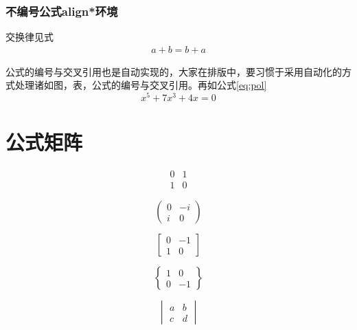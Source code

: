 \documentclass[12pt]{ctexbook}  %
\begin{document}
	\subsection{不编号公式align*环境}
	交换律见式
	\begin{align*}
		a+b=b+a	%
	\end{align*}

	公式的编号与交叉引用也是自动实现的，大家在排版中，要习惯于采用自动化的方式处理诸如图，表，公式的编号与交叉引用。再如公式\ref{eq:pol}
	\begin{equation}
		x^5 + 7x^3 + 4x = 0 \label{eq:pol}
	\end{equation}
	
	\chapter{公式矩阵}
	
	\[
	\begin{matrix}
		0 & 1\\1 & 0
	\end{matrix}
	\]
	
	\[
	\begin{pmatrix}
		0 & -i \\
		i & 0
	\end{pmatrix}
	\]
	
	\[
	\begin{bmatrix}
		0 & -1 \\
		1 & 0
	\end{bmatrix}
	\]
	
	\[
	\begin{Bmatrix}
		1 & 0 \\ 0 & -1
	\end{Bmatrix}
	\]
	
	\[
	\begin{vmatrix}
		a & b \\
		c & d
	\end{vmatrix}\]
\end{document}
